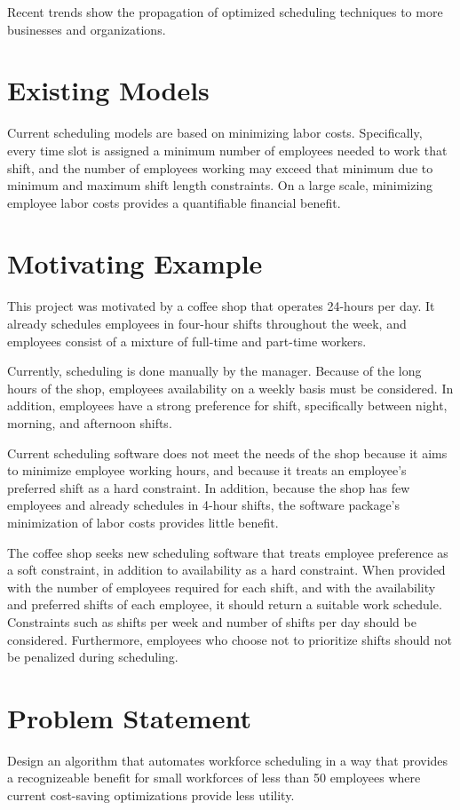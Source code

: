 Recent trends show the propagation of optimized scheduling techniques to more businesses and organizations.

\section{Existing Models}

Current scheduling models are based on minimizing labor costs. Specifically, every time slot is assigned a minimum number of employees needed to work that shift, and the number of employees working may exceed that minimum due to minimum and maximum shift length constraints.  On a large scale, minimizing employee labor costs provides a quantifiable financial benefit.

\section{Motivating Example}

This project was motivated by a coffee shop that operates 24-hours per day. It already schedules employees in four-hour shifts throughout the week, and employees consist of a mixture of full-time and part-time workers. 

Currently, scheduling is done manually by the manager. Because of the long hours of the shop, employees availability on a weekly basis must be considered. In addition, employees have a strong preference for shift, specifically between night, morning, and afternoon shifts. 

Current scheduling software does not meet the needs of the shop because it aims to minimize employee working hours, and because it treats an employee's preferred shift as a hard constraint. In addition, because the shop has few employees and already schedules in 4-hour shifts, the software package's minimization of labor costs provides little benefit. 

The coffee shop seeks new scheduling software that treats employee preference as a soft constraint, in addition to availability as a hard constraint. When provided with the number of employees required for each shift, and with the availability and preferred shifts of each employee, it should return a suitable work schedule. Constraints such as shifts per week and number of shifts per day should be considered. Furthermore, employees who choose not to prioritize shifts should not be penalized during scheduling. 



\section{Problem Statement}
Design an algorithm that automates workforce scheduling in a way that provides a recognizeable benefit for small workforces of less than 50 employees where current cost-saving optimizations provide less utility. 
